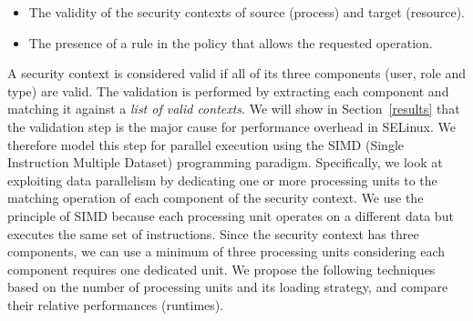 \documentclass[conference]{IEEEtran}
\begin{document}
\begin{itemize}

\item The validity of the security contexts of source (process) and
  target (resource).
\item The presence of a rule in the policy that allows the requested
  operation.

\end{itemize}

A security context is considered valid if all of its three components
(user, role and type) are valid.  The validation is performed by
extracting each component and matching it against a \emph{list of
  valid contexts}.  We will show in Section~\ref{results} that the
validation step is the major cause for performance overhead in
SELinux.  We therefore model this step for parallel execution using the
SIMD (Single Instruction Multiple Dataset) programming
paradigm.  Specifically, we look at exploiting data parallelism by
dedicating one or more processing units to the matching operation of
each component of the security context.  We use the principle of SIMD
because each processing unit operates on a different data but executes
the same set of instructions.  Since the security context has three
components, we can use a minimum of three processing units considering
each component requires one dedicated unit.  We propose the following
techniques based on the number of processing units and its loading
strategy, and compare their relative performances (runtimes).
\end{document}
